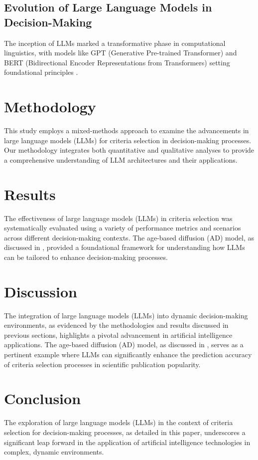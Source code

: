 \documentclass[twocolumn]{article}
\begin{document}
\subsection{Evolution of Large Language Models in Decision-Making}
The inception of LLMs marked a transformative phase in computational linguistics, with models like GPT (Generative Pre-trained Transformer) and BERT (Bidirectional Encoder Representations from Transformers) setting foundational principles \cite{Devlin2018}.

\section{Methodology}
This study employs a mixed-methods approach to examine the advancements in large language models (LLMs) for criteria selection in decision-making processes. Our methodology integrates both quantitative and qualitative analyses to provide a comprehensive understanding of LLM architectures and their applications.

\section{Results}
The effectiveness of large language models (LLMs) in criteria selection was systematically evaluated using a variety of performance metrics and scenarios across different decision-making contexts. The age-based diffusion (AD) model, as discussed in \cite{2010.08157v1}, provided a foundational framework for understanding how LLMs can be tailored to enhance decision-making processes.

\section{Discussion}
The integration of large language models (LLMs) into dynamic decision-making environments, as evidenced by the methodologies and results discussed in previous sections, highlights a pivotal advancement in artificial intelligence applications. The age-based diffusion (AD) model, as discussed in \cite{2010.08157v1}, serves as a pertinent example where LLMs can significantly enhance the prediction accuracy of criteria selection processes in scientific publication popularity.

\section{Conclusion}
The exploration of large language models (LLMs) in the context of criteria selection for decision-making processes, as detailed in this paper, underscores a significant leap forward in the application of artificial intelligence technologies in complex, dynamic environments.



\end{document}
